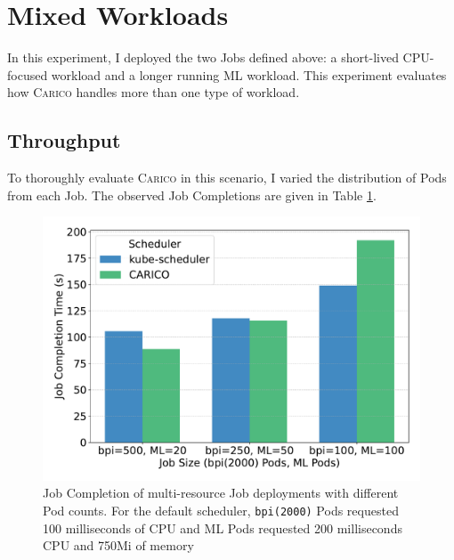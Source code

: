 \section{Mixed Workloads}
\label{sec:eval-mixed}
In this experiment, I deployed the two Jobs defined above: a short-lived
CPU-focused workload and a longer running ML workload. This experiment evaluates
how \textsc{Carico} handles more than one type of workload.

\subsection{Throughput}
To thoroughly evaluate \textsc{Carico} in this scenario, I varied the distribution of
Pods from each Job. The observed Job Completions are given in Table
\ref{tab:mixed-throughput}.

\begin{figure}[ht!]
    \centering
    \includegraphics[width=\textwidth]{images/mixed-job-completion.pdf}
    \caption{Job Completion of multi-resource Job deployments with different Pod
    counts. For the default scheduler, \texttt{bpi(2000)} Pods requested 100
    milliseconds of CPU and ML Pods requested 200 milliseconds CPU and 750Mi of
    memory}
    \label{tab:mixed-throughput}
\end{figure}

